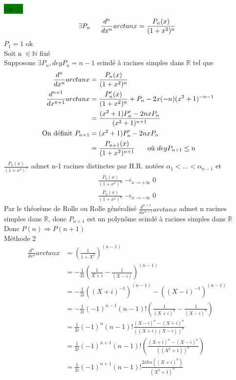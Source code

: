 \documentclass{article}
\begin{document}
\noindent \colorbox{green}{630.11}\\
\begin{equation*}
    \exists P_n \indent \frac{d^n}{dx^n}arctan x = \frac{P_n(x)}{(1+x^2)^n}
\end{equation*}
\(P_1 = 1\) ok\\
Soit n \(\in \mathbb{N}\) fixé \\
Supposons \(\exists P_n, deg P_n = n-1\) scindé à racines simples 
dans \(\mathbb{R}\) tel que \\
\begin{align*}
    \frac{d^n}{dx^n}arctan x &= \frac{P_n(x)}{(1+x^2)^n}\\
    \frac{d^{n+1}}{dx^{n+1}}arctan x &= \frac{P_n'(x)}{(1+x^2)^n} + P_n - 2x(-n)(x^2 + 1)^{-n-1}\\
    &= \frac{(x^2 + 1)P'_n - 2nxP_n}{(x^2+1)^{n+1}}\\
    \text{ On définit } P_{n+1} &= (x^2 + 1)P'_n - 2nxP_n\\
    &= \frac{P_{n+1}(x)}{(1+x^2)^{n+1}} \indent \text{ où } degP_{n+1} \leq n
\end{align*}
\(\frac{P_n(x)}{(1+x^2)^n}\) admet n-1 racines distinctes par H.R. notées \(\alpha_1<...<\alpha_{n-1}\)
et \begin{align*}
    \frac{P_n(x)}{(1+x^2)^n} \rightarrow_{x \to +\infty} 0\\
    \frac{P_n(x)}{(1+x^2)^n} \rightarrow_{x \to -\infty} 0 
\end{align*}
Par le théorème de Rolle ou Rolle généralisé \(\frac{d^{n+1}}{dx^{n+1}}arctan x\)
admet n racines simples dans \(\mathbb{R}\), donc \(P_{n+1}\) est un polynôme scindé
à racines simples dans \(\mathbb{R}\)\\
Donc \(P(n) \Rightarrow P(n+1)\)\\
\colorbox{lemon}{Méthode 2} \begin{align*}
    \frac{d^{n}}{dx^{n}}arctan x &= (\frac{1}{1+X^2})^{(n-1)}\\
    &= -\frac{1}{2i}(\frac{1}{X+i} - \frac{1}{(X-i)})^{(n-1)}\\
    &= -\frac{1}{2i} ((X+i)^{-1})^{(n-1)} - ((X-i)^{-1})^{(n-1)}\\
    &= -\frac{1}{2i}(-1)^{n-1}(n-1)!(\frac{1}{(X+i)^n}-\frac{1}{(X-i)^n})\\
    &= \frac{1}{2i}(-1)^n(n-1)!\frac{(X-i)^n-(X+i)^n}{((X+i)(X-i))^n}\\
    &= \frac{1}{2i}(-1)^{n+1}(n-1)!(\frac{(X+i)^n-(X-i)^n}{((X^2+1))^n})\\
    &= \frac{1}{2i}(-1)^{n+1}(n-1)!\frac{2iIm((X+i)^n)}{(X^2+1)^n}
\end{align*}
\end{document}
